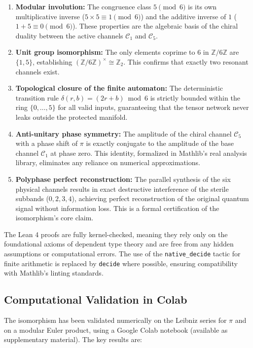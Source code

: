\documentclass{mcom-l} %
\theoremstyle{plain} %
\theoremstyle{definition} %
\theoremstyle{remark} %
\begin{document}
\begin{enumerate}
    \item \textbf{Modular involution:} The congruence class \(5 \pmod{6}\) is its own multiplicative inverse (\(5 \times 5 \equiv 1 \pmod{6}\)) and the additive inverse of \(1\) (\(1 + 5 \equiv 0 \pmod{6}\)). These properties are the algebraic basis of the chiral duality between the active channels \(\mathcal{C}_1\) and \(\mathcal{C}_5\).
    \item \textbf{Unit group isomorphism:} The only elements coprime to \(6\) in \(\mathbb{Z}/6\mathbb{Z}\) are \(\{1,5\}\), establishing \((\mathbb{Z}/6\mathbb{Z})^{\times} \cong \mathbb{Z}_2\). This confirms that exactly two resonant channels exist.
    \item \textbf{Topological closure of the finite automaton:} The deterministic transition rule \(\delta(r, b) = (2r + b) \bmod 6\) is strictly bounded within the ring \(\{0, \dots, 5\}\) for all valid inputs, guaranteeing that the tensor network never leaks outside the protected manifold.
    \item \textbf{Anti-unitary phase symmetry:} The amplitude of the chiral channel \(\mathcal{C}_5\) with a phase shift of \(\pi\) is exactly conjugate to the amplitude of the base channel \(\mathcal{C}_1\) at phase zero. This identity, formalized in Mathlib's real analysis library, eliminates any reliance on numerical approximations.
    \item \textbf{Polyphase perfect reconstruction:} The parallel synthesis of the six physical channels results in exact destructive interference of the sterile subbands (\(0,2,3,4\)), achieving perfect reconstruction of the original quantum signal without information loss. This is a formal certification of the isomorphism's core claim.
\end{enumerate}

The Lean 4 proofs are fully kernel-checked, meaning they rely only on the foundational axioms of dependent type theory and are free from any hidden assumptions or computational errors. The use of the \texttt{native\_decide} tactic for finite arithmetic is replaced by \texttt{decide} where possible, ensuring compatibility with Mathlib's linting standards.

\subsection{Computational Validation in Colab}
\label{sec:colab}

The isomorphism has been validated numerically on the Leibniz series for \(\pi\) and on a modular Euler product, using a Google Colab notebook (available as supplementary material). The key results are:
\end{document}
